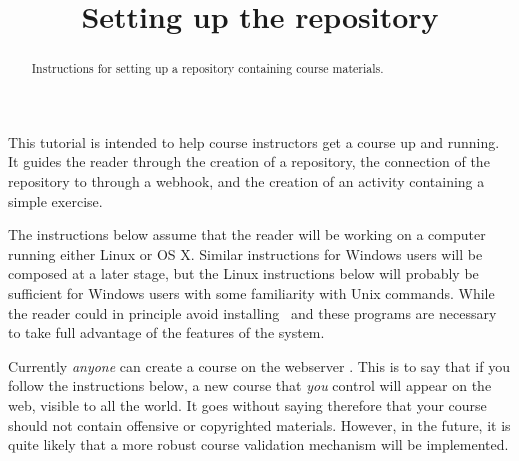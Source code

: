 \documentclass{ximera}
\title{Setting up the repository}
\begin{document}
\begin{abstract}
Instructions for setting up a repository containing course materials.
\end{abstract}
\maketitle

This tutorial is intended to help course instructors get a
course up and running. It guides the reader through the creation of a
repository, the connection of the repository to
through a webhook, and the creation of an activity containing a 
simple exercise.

The instructions below assume that the reader will be
working on a computer running either Linux or OS X.
Similar instructions for Windows users will be composed
at a later stage, but the Linux instructions below will probably
be sufficient for Windows users with some familiarity with Unix commands.
While the reader could in principle avoid installing 
\ and
 these programs are necessary
to take full advantage of the features of the 
 system.

\begin{warning} Currently {\em anyone} can
create a course on the webserver
.
This is to say that if you follow the instructions below,
a new course that {\em you} control will appear on the web,
visible to all the world. It goes without saying therefore that
your course should not contain offensive or copyrighted
materials. However, in the future, it is quite likely that a
more robust course validation mechanism will be implemented.
\end{warning}
\end{document}
